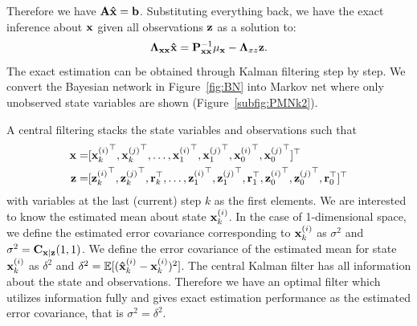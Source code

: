 Therefore we have ${\bf A}{\bf\hat x}={\bf b}$. Substituting everything back, we have the exact inference about ${\bf x}$ given all observations $\bf z$ as a solution to:
\begin{equation}
\label{eq:EI}
{\bf \Lambda}_{\bf xx}{\bf\hat x}={\bf P}_{\bf xx}^{-1}\mu_{\bf x}-{\bf \Lambda}_{xz}{\bf z}.
\end{equation}
The exact estimation can be obtained through Kalman filtering step by step. We convert the Bayesian network in Figure~\ref{fig:BN} into Markov net where only unobserved state variables are shown (Figure~\ref{subfig:PMNk2}). 

A central filtering stacks the state variables and observations such that
\begin{equation}
\begin{split}
    {\bf x}=&[{{\bf x}^{(i)}_{k}}^\top, {{\bf x}^{(j)}_{k}}^\top, \ldots, {{\bf x}^{(i)}_{1}}^\top, {{\bf x}^{(j)}_{1}}^\top, {{\bf x}^{(i)}_{0}}^\top, {{\bf x}^{(j)}_{0}}^\top]^\top \\
    {\bf z}=&[{{\bf z}^{(i)}_{k}}^\top, {{\bf z}^{(j)}_{k}}^\top, {\bf r}_{k}^\top, \ldots, {{\bf z}^{(i)}_{1}}^\top, {{\bf z}^{(j)}_{1}}^\top, {\bf r}_{1}^\top, {{\bf z}^{(i)}_{0}}^\top, {{\bf z}^{(j)}_{0}}^\top, {\bf r}_{0}^\top]^\top
\end{split}
\end{equation}
with variables at the last (current) step $k$ as the first elements. We are interested to know the estimated mean about state ${\bf x}^{(i)}_{k}$. In the case of 1-dimensional space, we define the estimated error covariance corresponding to ${\bf x}^{(i)}_{k}$ as $\sigma^2$ and $\sigma^2={\bf C}_{{\bf x}|{\bf z}}(1,1)$. We define the error covariance of the estimated mean for state ${\bf x}^{(i)}_{k}$ as $\delta^2$ and $\delta^2=\mathbb{E}[({\bf\hat x}^{(i)}_k-{\bf x}^{(i)}_{k})^2]$. The central Kalman filter has all information about the state and observations. Therefore we have an optimal filter which utilizes information fully and gives exact estimation performance as the estimated error covariance, that is $\sigma^2=\delta^2$.




